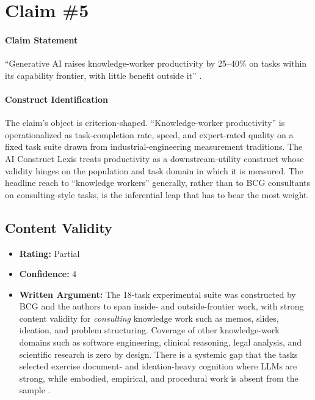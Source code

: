 \section{Claim \#5}

\paragraph{Claim Statement} ``Generative AI raises knowledge-worker productivity by 25--40\% on tasks within its capability frontier, with little benefit outside it'' \citep{dellacqua2023jagged}.

\paragraph{Construct Identification} The claim's object is criterion-shaped. ``Knowledge-worker productivity'' is operationalized as task-completion rate, speed, and expert-rated quality on a fixed task suite drawn from industrial-engineering measurement traditions. The AI Construct Lexis \citep{aiconstructlexis} treats productivity as a downstream-utility construct whose validity hinges on the population and task domain in which it is measured. The headline reach to ``knowledge workers'' generally, rather than to BCG consultants on consulting-style tasks, is the inferential leap that has to bear the most weight.

\subsection{Content Validity}
\begin{itemize}
    \item \textbf{Rating:} Partial
    \item \textbf{Confidence:} 4
    \item \textbf{Written Argument:} The 18-task experimental suite was constructed by BCG and the authors to span inside- and outside-frontier work, with strong content validity for \emph{consulting} knowledge work such as memos, slides, ideation, and problem structuring. Coverage of other knowledge-work domains such as software engineering, clinical reasoning, legal analysis, and scientific research is zero by design. There is a systemic gap that the tasks selected exercise document- and ideation-heavy cognition where LLMs are strong, while embodied, empirical, and procedural work is absent from the sample \citep{salaudeen2025measurement}.
\end{itemize}

